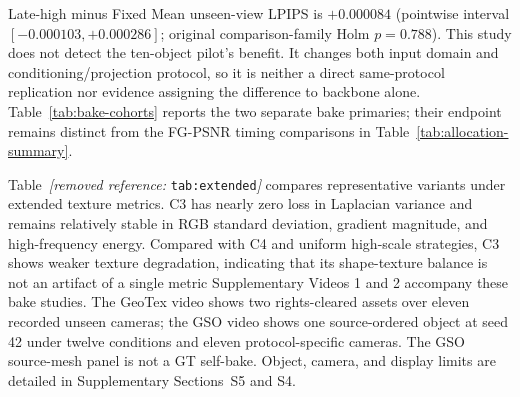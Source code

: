 \documentclass[times,twocolumn,final]{elsarticle}
\providecommand{\DIFadd}[1]{{\protect\color{blue} \sf #1}} %
\providecommand{\DIFdel}[1]{{\protect\color{red} \scriptsize #1}} %
\providecommand{\DIFaddbegin}{} %
\providecommand{\DIFaddend}{} %
\providecommand{\DIFdelbegin}{} %
\providecommand{\DIFdelend}{} %
\begin{document}
\DIFdelend \DIFaddbegin \DIFadd{Late-high minus Fixed Mean unseen-view LPIPS is $+0.000084$ (pointwise interval $[-0.000103,+0.000286]$; original comparison-family Holm $p=0.788$). This study does not detect the ten-object pilot's benefit. It changes both input domain and conditioning/projection protocol, so it is neither a direct same-protocol replication nor evidence assigning the difference to backbone alone. Table~\ref{tab:bake-cohorts} reports the two separate bake primaries; their endpoint remains distinct from the FG-PSNR timing comparisons in Table~\ref{tab:allocation-summary}.
}\DIFaddend

\DIFdelbegin \DIFdel{Table~\textit{[removed reference: }\texttt{tab:extended}\textit{]} compares representative variants under extended texture metrics. C3 has nearly zero loss in Laplacian variance and remains relatively stable in RGB standard deviation, gradient magnitude, and high-frequency energy. Compared with C4 and uniform high-scale strategies, C3 shows weaker texture degradation, indicating that its shape-texture balance is not an artifact of a single metric}\DIFdelend \DIFaddbegin \DIFadd{Supplementary Videos 1 and 2 accompany these bake studies. The GeoTex video shows two rights-cleared assets over eleven recorded unseen cameras; the GSO video shows one source-ordered object at seed 42 under twelve conditions and eleven protocol-specific cameras. The GSO source-mesh panel is not a GT self-bake. Object, camera, and display limits are detailed in Supplementary Sections~S5 and S4}\DIFaddend .
\end{document}
